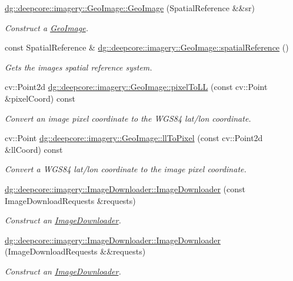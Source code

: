 \begin{DoxyCompactItemize}
\hyperlink{group___imagery_module_gab093ef27cf8008d6ce61679a374f9fe8}{dg\+::deepcore\+::imagery\+::\+Geo\+Image\+::\+Geo\+Image} (Spatial\+Reference \&\&sr)
\begin{DoxyCompactList}\small\item\em Construct a \hyperlink{classdg_1_1deepcore_1_1imagery_1_1_geo_image}{Geo\+Image}. \end{DoxyCompactList}\item 
const Spatial\+Reference \& \hyperlink{group___imagery_module_ga5a6179a2654ef54bf2605ad9e8dbd55a}{dg\+::deepcore\+::imagery\+::\+Geo\+Image\+::spatial\+Reference} ()
\begin{DoxyCompactList}\small\item\em Gets the image\textquotesingle{}s spatial reference system. \end{DoxyCompactList}\item 
cv\+::\+Point2d \hyperlink{group___imagery_module_gaee0adba3fd2460a68400cc7f0df8881b}{dg\+::deepcore\+::imagery\+::\+Geo\+Image\+::pixel\+To\+LL} (const cv\+::\+Point \&pixel\+Coord) const 
\begin{DoxyCompactList}\small\item\em Convert an image pixel coordinate to the W\+G\+S84 lat/lon coordinate. \end{DoxyCompactList}\item 
cv\+::\+Point \hyperlink{group___imagery_module_ga4f8b895c73c1088b06d62035f6fab687}{dg\+::deepcore\+::imagery\+::\+Geo\+Image\+::ll\+To\+Pixel} (const cv\+::\+Point2d \&ll\+Coord) const 
\begin{DoxyCompactList}\small\item\em Convert a W\+G\+S84 lat/lon coordinate to the image pixel coordinate. \end{DoxyCompactList}\item 
\hyperlink{group___imagery_module_ga72fc422dd0b77c0a04e4f86b15d60fa3}{dg\+::deepcore\+::imagery\+::\+Image\+Downloader\+::\+Image\+Downloader} (const Image\+Download\+Requests \&requests)
\begin{DoxyCompactList}\small\item\em Construct an \hyperlink{classdg_1_1deepcore_1_1imagery_1_1_image_downloader}{Image\+Downloader}. \end{DoxyCompactList}\item 
\hyperlink{group___imagery_module_gaa2d0277480846121930f1a18e4ed7875}{dg\+::deepcore\+::imagery\+::\+Image\+Downloader\+::\+Image\+Downloader} (Image\+Download\+Requests \&\&requests)
\begin{DoxyCompactList}\small\item\em Construct an \hyperlink{classdg_1_1deepcore_1_1imagery_1_1_image_downloader}{Image\+Downloader}. \end{DoxyCompactList}\item 

\end{DoxyCompactItemize}
